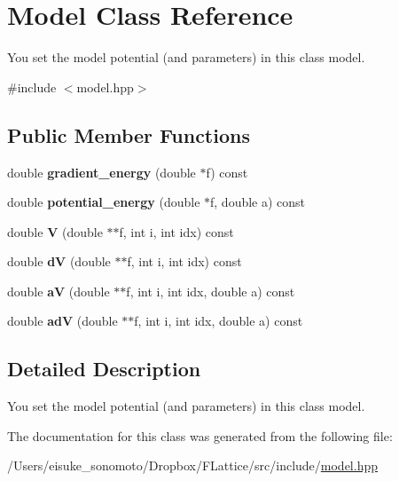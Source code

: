 \hypertarget{class_model}{}\section{Model Class Reference}
\label{class_model}


You set the model potential (and parameters) in this class model.  




{\ttfamily \#include $<$model.\+hpp$>$}

\subsection*{Public Member Functions}
\begin{DoxyCompactItemize}
\item 
\mbox{\label{class_model_ab00000d80ed947859bc69f05322d8038}} 
double {\bfseries gradient\+\_\+energy} (double $\ast$f) const
\item 
\mbox{\label{class_model_ad84316146a32691f3c66f774eedcc139}} 
double {\bfseries potential\+\_\+energy} (double $\ast$f, double a) const
\item 
\mbox{\label{class_model_a4a75608c37107dfac5dc2f3e8b5b6665}} 
double {\bfseries V} (double $\ast$$\ast$f, int i, int idx) const
\item 
\mbox{\label{class_model_a21e3d33156c7ddc20a4bbf198ad43300}} 
double {\bfseries dV} (double $\ast$$\ast$f, int i, int idx) const
\item 
\mbox{\label{class_model_ac5eca5bd8d56ad529c767f89b020df8d}} 
double {\bfseries aV} (double $\ast$$\ast$f, int i, int idx, double a) const
\item 
\mbox{\label{class_model_a1d0c7d5e8de5e402a95a3290fc027bee}} 
double {\bfseries adV} (double $\ast$$\ast$f, int i, int idx, double a) const
\end{DoxyCompactItemize}


\subsection{Detailed Description}
You set the model potential (and parameters) in this class model. 

The documentation for this class was generated from the following file\+:\begin{DoxyCompactItemize}
\item 
/\+Users/eisuke\+\_\+sonomoto/\+Dropbox/\+F\+Lattice/src/include/\mbox{\hyperlink{model_8hpp}{model.\+hpp}}\end{DoxyCompactItemize}

